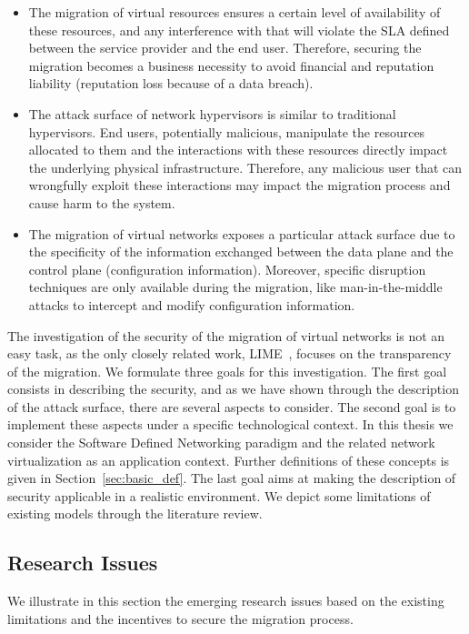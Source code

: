 \begin{itemize}
    
    \item The migration of virtual resources ensures a certain level of availability of these resources, and any interference with that will violate the SLA defined between the service provider and the end user.
    Therefore, securing the migration becomes a business necessity to avoid financial and reputation liability (\eg reputation loss because of a data breach).
    
    \item The attack surface of network hypervisors is similar to traditional hypervisors. End users, potentially malicious, manipulate the resources allocated to them and the interactions with these resources directly impact the underlying physical infrastructure. Therefore, any malicious user that can wrongfully exploit these interactions may impact the migration process and cause harm to the system.

    \item The migration of virtual networks exposes a particular attack surface due to the specificity of the information exchanged between the data plane and the control plane (\eg configuration information). Moreover, specific disruption techniques are only available during the migration, like man-in-the-middle attacks to intercept and modify configuration information.  
\end{itemize}

The investigation of the security of the migration of virtual networks is not an easy task, as the only closely related work, LIME~\cite{Lime-Ghorbani2014}, focuses on the transparency of the migration. 
We formulate three goals for this investigation.
The first goal consists in describing the security, and as we have shown through the description of the attack surface, there are several aspects to consider. 
The second goal is to implement these aspects under a specific technological context. In this thesis we consider the Software Defined Networking paradigm and the related network virtualization as an application context. Further definitions of these concepts is given in Section~\ref{sec:basic_def}. 
The last goal aims at making the description of security applicable in a realistic environment.
We depict some limitations of existing models through the literature review.


\subsection{Research Issues}
We illustrate in this section the emerging research issues based on the existing limitations and the incentives to secure the migration process.

